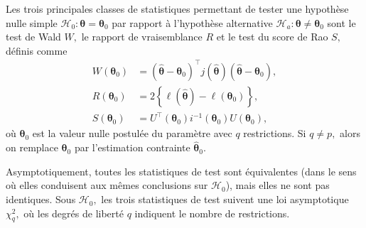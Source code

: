 \documentclass[
  11pt,
  letterpaper,
]{scrbook}
\theoremstyle{plain}
\theoremstyle{plain}
\theoremstyle{definition}
\theoremstyle{definition}
\theoremstyle{remark}
\begin{document}
Les trois principales classes de statistiques permettant de tester une
hypothèse nulle simple
\(\mathscr{H}_0 : \boldsymbol{\theta}=\boldsymbol{\theta}_0\) par
rapport à l'hypothèse alternative
\(\mathscr{H}_a : \boldsymbol{\theta} \neq \boldsymbol{\theta}_0\) sont
le test de Wald \(W,\) le rapport de vraisemblance \(R\) et le test du
score de Rao \(S,\) définis comme \begin{align*}
 W(\boldsymbol{\theta}_0) &= (\widehat{\boldsymbol{\theta}}-\boldsymbol{\theta}_0)^\top j(\widehat{\boldsymbol{\theta}})(\widehat{\boldsymbol{\theta}}-\boldsymbol{\theta}_0), \\
 R(\boldsymbol{\theta}_0) &= 2 \left\{ \ell(\widehat{\boldsymbol{\theta}})-\ell(\boldsymbol{\theta}_0)\right\},\\
 S(\boldsymbol{\theta}_0) &= U^\top(\boldsymbol{\theta}_0)i^{-1}(\boldsymbol{\theta}_0)U(\boldsymbol{\theta}_0), 
\end{align*} où \(\boldsymbol{\theta}_0\) est la valeur nulle postulée
du paramètre avec \(q\) restrictions. Si \(q \neq p,\) alors on remplace
\(\boldsymbol{\theta}_0\) par l'estimation contrainte
\(\widehat{\boldsymbol{\theta}}_0.\)

Asymptotiquement, toutes les statistiques de test sont équivalentes
(dans le sens où elles conduisent aux mêmes conclusions sur
\(\mathscr{H}_0\)), mais elles ne sont pas identiques. Sous
\(\mathscr{H}_0,\) les trois statistiques de test suivent une loi
asymptotique \(\chi^2_q,\) où les degrés de liberté \(q\) indiquent le
nombre de restrictions.
\end{document}
